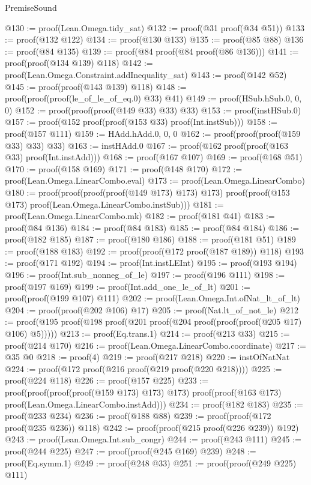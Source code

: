 \begin{lexlean}{PremiseSound}
\begin{coremodule}
@130 := proof(Lean.Omega.tidy_sat)
@132 := proof(@31 proof(@34 @51))
@133 := proof(@132 @122)
@134 := proof(@130 @133)
@135 := proof(@85 @88)
@136 := proof(@84 @135)
@139 := proof(@84 proof(@84 proof(@86 @136)))
@141 := proof(proof(@134 @139) @118)
@142 := proof(Lean.Omega.Constraint.addInequality_sat)
@143 := proof(@142 @52)
@145 := proof(proof(@143 @139) @118)
@148 := proof(proof(proof(le_of_le_of_eq.{0}) @33) @41)
@149 := proof(HSub.hSub.{0, 0, 0})
@152 := proof(proof(proof(@149 @33) @33) @33)
@153 := proof(instHSub.{0})
@157 := proof(@152 proof(proof(@153 @33) proof(Int.instSub)))
@158 := proof(@157 @111)
@159 := HAdd.hAdd.{0, 0, 0}
@162 := proof(proof(proof(@159 @33) @33) @33)
@163 := instHAdd.{0}
@167 := proof(@162 proof(proof(@163 @33) proof(Int.instAdd)))
@168 := proof(@167 @107)
@169 := proof(@168 @51)
@170 := proof(@158 @169)
@171 := proof(@148 @170)
@172 := proof(Lean.Omega.LinearCombo.eval)
@173 := proof(Lean.Omega.LinearCombo)
@180 := proof(proof(proof(proof(@149 @173) @173) @173)
      proof(proof(@153 @173) proof(Lean.Omega.LinearCombo.instSub)))
@181 := proof(Lean.Omega.LinearCombo.mk)
@182 := proof(@181 @41)
@183 := proof(@84 @136)
@184 := proof(@84 @183)
@185 := proof(@84 @184)
@186 := proof(@182 @185)
@187 := proof(@180 @186)
@188 := proof(@181 @51)
@189 := proof(@188 @183)
@192 := proof(proof(@172 proof(@187 @189)) @118)
@193 := proof(@171 @192)
@194 := proof(Int.instLEInt)
@195 := proof(@193 @194)
@196 := proof(Int.sub_nonneg_of_le)
@197 := proof(@196 @111)
@198 := proof(@197 @169)
@199 := proof(Int.add_one_le_of_lt)
@201 := proof(proof(@199 @107) @111)
@202 := proof(Lean.Omega.Int.ofNat_lt_of_lt)
@204 := proof(proof(@202 @106) @17)
@205 := proof(Nat.lt_of_not_le)
@212 := proof(@195 proof(@198 proof(@201 proof(@204 proof(proof(proof(@205 @17) @106) @5)))))
@213 := proof(Eq.trans.{1})
@214 := proof(@213 @33)
@215 := proof(@214 @170)
@216 := proof(Lean.Omega.LinearCombo.coordinate)
@217 := @35 @0
@218 := proof(4)
@219 := proof(@217 @218)
@220 := instOfNatNat
@224 := proof(@172 proof(@216 proof(@219 proof(@220 @218))))
@225 := proof(@224 @118)
@226 := proof(@157 @225)
@233 := proof(proof(proof(proof(@159 @173) @173) @173)
      proof(proof(@163 @173) proof(Lean.Omega.LinearCombo.instAdd)))
@234 := proof(@182 @183)
@235 := proof(@233 @234)
@236 := proof(@188 @88)
@239 := proof(proof(@172 proof(@235 @236)) @118)
@242 := proof(proof(@215 proof(@226 @239)) @192)
@243 := proof(Lean.Omega.Int.sub_congr)
@244 := proof(@243 @111)
@245 := proof(@244 @225)
@247 := proof(proof(@245 @169) @239)
@248 := proof(Eq.symm.{1})
@249 := proof(@248 @33)
@251 := proof(proof(@249 @225) @111)

\end{coremodule}
\end{lexlean}
